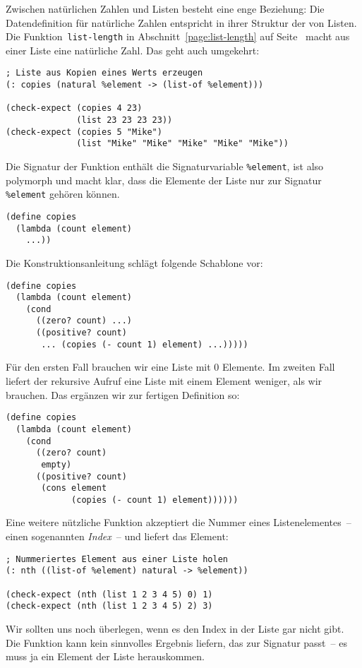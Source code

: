 Zwischen natürlichen Zahlen und Listen besteht eine enge Beziehung:
Die Datendefinition für natürliche Zahlen entspricht in ihrer Struktur
der von Listen.  Die Funktion~\lstinline{list-length} in
Abschnitt~\ref{page:list-length} auf Seite~\pageref{page:list-length}
macht aus einer Liste eine natürliche Zahl.  Das geht auch umgekehrt:
%
\begin{lstlisting}
; Liste aus Kopien eines Werts erzeugen
(: copies (natural %element -> (list-of %element)))

(check-expect (copies 4 23)
              (list 23 23 23 23))
(check-expect (copies 5 "Mike")
              (list "Mike" "Mike" "Mike" "Mike" "Mike"))
\end{lstlisting}
%
Die Signatur der Funktion enthält die Signaturvariable \lstinline{%element}, ist also
polymorph und macht klar, dass die Elemente der Liste nur zur Signatur
\lstinline{%element} gehören können.
%
\begin{lstlisting}
(define copies
  (lambda (count element)
    ...))
\end{lstlisting}
%
Die Konstruktionsanleitung schlägt folgende Schablone vor:
%
\begin{lstlisting}
(define copies
  (lambda (count element)
    (cond
      ((zero? count) ...)
      ((positive? count)
       ... (copies (- count 1) element) ...)))))
\end{lstlisting}
%
Für den ersten Fall brauchen wir eine Liste mit 0 Elemente.  Im
zweiten Fall liefert der rekursive Aufruf eine Liste mit einem Element
weniger, als wir brauchen. Das ergänzen wir zur fertigen Definition
so:
%
\begin{lstlisting}
(define copies
  (lambda (count element)
    (cond
      ((zero? count)
       empty)
      ((positive? count)
       (cons element
             (copies (- count 1) element))))))
\end{lstlisting}
%
Eine weitere nützliche Funktion akzeptiert die Nummer eines
Listenelementes~-- einen sogenannten \textit{Index}~--
und liefert das Element:
%
\begin{lstlisting}
; Nummeriertes Element aus einer Liste holen
(: nth ((list-of %element) natural -> %element))

(check-expect (nth (list 1 2 3 4 5) 0) 1)
(check-expect (nth (list 1 2 3 4 5) 2) 3)
\end{lstlisting}
%
Wir sollten uns noch überlegen, wenn es den Index in der Liste gar
nicht gibt.  Die Funktion kann kein sinnvolles Ergebnis liefern, das
zur Signatur passt~-- es muss ja ein Element der Liste herauskommen.
